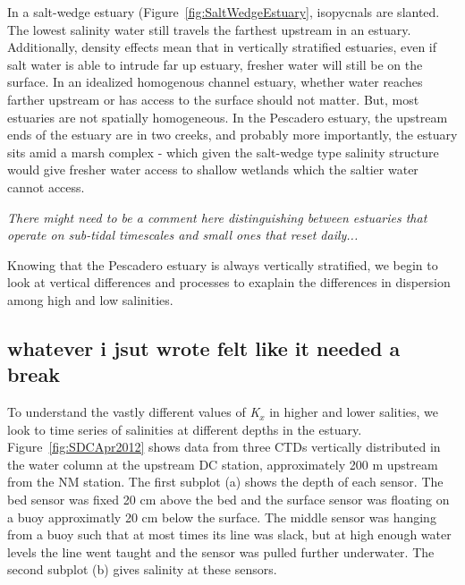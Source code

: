 In a salt-wedge estuary (Figure~\ref{fig:SaltWedgeEstuary}, isopycnals are slanted. The lowest salinity water still travels the farthest upstream in an estuary. Additionally, density effects mean that in vertically stratified estuaries, even if salt water is able to intrude far up estuary, fresher water will still be on the surface. In an idealized homogenous channel estuary, whether water reaches farther upstream or has access to the surface should not matter. But, most estuaries are not spatially homogeneous. In the Pescadero estuary, the upstream ends of the estuary are in two creeks, and probably more importantly, the estuary sits amid a marsh complex - which given the salt-wedge type salinity structure would give fresher water access to shallow wetlands which the saltier water cannot access. 

\emph{There might need to be a comment here distinguishing between estuaries that operate on sub-tidal timescales and small ones that reset daily...}

Knowing that the Pescadero estuary is always vertically stratified, we begin to look at vertical differences and processes to exaplain the differences in dispersion among high and low salinities. 

\subsection{whatever i jsut wrote felt like it needed a break}

To understand the vastly different values of \emph{K$_x$} in higher and lower salities, we look to time series of salinities at different depths in the estuary. Figure~\ref{fig:SDCApr2012} shows data from three CTDs vertically distributed in the water column at the upstream DC station, approximately 200 m upstream from the NM station. The first subplot (a) shows the depth of each sensor. The bed sensor was fixed 20 cm above the bed and the surface sensor was floating on a buoy approximatly 20 cm below the surface. The middle sensor was hanging from a buoy such that at most times its line was slack, but at high enough water levels the line went taught and the sensor was pulled further underwater. The second subplot (b) gives salinity at these sensors.


